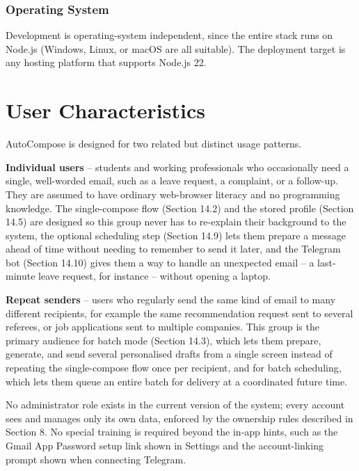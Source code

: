 \documentclass[12pt,a4paper]{article}
\begin{document}
\subsubsection{Operating System}
Development is operating-system independent, since the entire stack runs on Node.js (Windows, Linux, or macOS are all suitable).  The deployment target is any hosting platform that supports Node.js 22.

\section{User Characteristics}

AutoCompose is designed for two related but distinct usage patterns.

\textbf{Individual users} -- students and working professionals who occasionally need a single, well-worded email, such as a leave request, a complaint, or a follow-up. They are assumed to have ordinary web-browser literacy and no programming knowledge. The single-compose flow (Section 14.2) and the stored profile (Section 14.5) are designed so this group never has to re-explain their background to the system, the optional scheduling step (Section 14.9) lets them prepare a message ahead of time without needing to remember to send it later, and the Telegram bot (Section 14.10) gives them a way to handle an unexpected email -- a last-minute leave request, for instance -- without opening a laptop.

\textbf{Repeat senders} -- users who regularly send the same kind of email to many different recipients, for example the same recommendation request sent to several referees, or job applications sent to multiple companies. This group is the primary audience for batch mode (Section 14.3), which lets them prepare, generate, and send several personalised drafts from a single screen instead of repeating the single-compose flow once per recipient, and for batch scheduling, which lets them queue an entire batch for delivery at a coordinated future time.

No administrator role exists in the current version of the system; every account sees and manages only its own data, enforced by the ownership rules described in Section 8. No special training is required beyond the in-app hints, such as the Gmail App Password setup link shown in Settings and the account-linking prompt shown when connecting Telegram.
\end{document}
